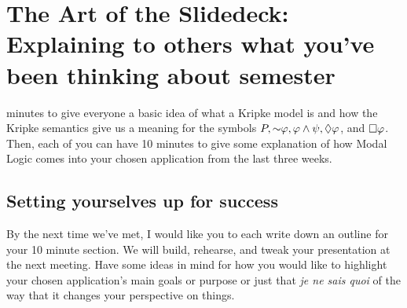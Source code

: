 \chapter[Presentation Preparations]{The Art of the Slidedeck: Explaining to others what you've been thinking about semester}
minutes to give everyone a basic idea of what a Kripke model is and how the Kripke semantics give us a meaning for the symbols
$P, \mathord{\sim} \varphi, \varphi \wedge \psi, \lozenge \varphi$, and $\square \varphi$. Then, each of you can have 10 minutes to 
give some explanation of how Modal Logic comes into your chosen application from the last three weeks.

\setcounter{section}{-1}

\section{Setting yourselves up for success}
By the next time we've met, I would like you to each write down an outline for your 10 minute section. We will build, rehearse,
and tweak your presentation at the next meeting. Have some ideas in mind for how you would like to highlight your chosen
application's main goals or purpose or just that \emph{je ne sais quoi} of the way that it changes your perspective on things.
